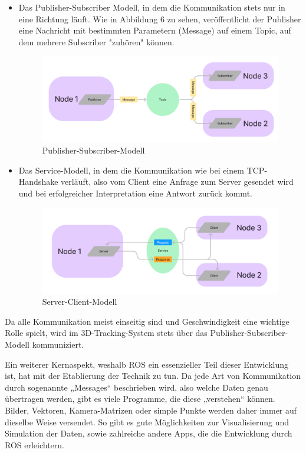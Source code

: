 \documentclass[12pt, ngerman]{article}
\begin{document}
\begin{itemize}
  \item Das Publisher-Subscriber Modell, in dem die Kommunikation stets nur in eine Richtung läuft. Wie in Abbildung 6 zu sehen, veröffentlicht der Publisher eine Nachricht mit bestimmten Parametern (Message) auf einem Topic, auf dem mehrere Subscriber "zuhören" können. 
  \begin{figure}[h]
    \includegraphics[angle=0,width=\linewidth]{Publisher.png}
    \caption{Publisher-Subscriber-Modell}
  \end{figure}
  \item Das Service-Modell, in dem die Kommunikation wie bei einem TCP-Handshake verläuft, also vom Client eine Anfrage zum Server gesendet wird und bei erfolgreicher Interpretation eine Antwort zurück kommt. 
  \begin{figure}[h]
    \includegraphics[angle=0,width=\linewidth]{Server.png}
    \caption{Server-Client-Modell}
  \end{figure}
\end{itemize}

Da alle Kommunikation meist einseitig sind und Geschwindigkeit eine wichtige Rolle spielt, wird im 3D-Tracking-System stets über das Publisher-Subscriber-Modell kommuniziert.

Ein weiterer Kernaspekt, weshalb ROS ein essenzieller Teil dieser Entwicklung ist, hat mit der Etablierung der Technik zu tun. Da jede Art von Kommunikation durch sogenannte „Messages“ beschrieben wird, also welche Daten genau übertragen werden, gibt es viele Programme, die diese „verstehen“ können. Bilder, Vektoren, Kamera-Matrizen oder simple Punkte werden daher immer auf dieselbe Weise versendet. So gibt es gute Möglichkeiten zur Visualisierung und Simulation der Daten, sowie zahlreiche andere Apps, die die Entwicklung durch ROS erleichtern. 
\end{document}
